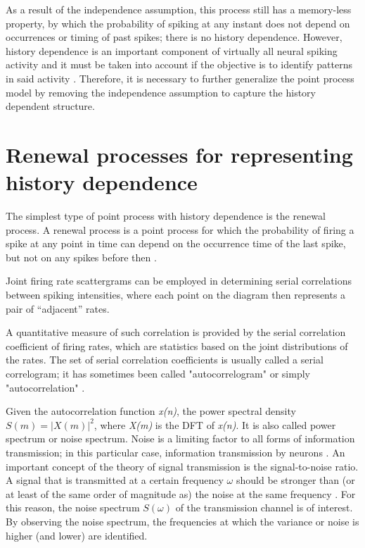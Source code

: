 \documentclass{kththesis}
\begin{document}
As a result of the independence assumption, this process still has a memory-less property, by which the probability of spiking at any instant does not depend on occurrences or timing of past spikes; there is no history dependence. 
However, history dependence is an important component of virtually all neural spiking activity and it must be taken into account if the objective is to identify patterns in said activity \parencite{Perkel}. 
Therefore, it is necessary to further generalize the point process model by removing the independence assumption to capture the history dependent structure.

\section{Renewal processes for representing history dependence}

The simplest type of point process with history dependence is the renewal process. 
A renewal process is a point process for which the probability of firing a spike at any point in time can depend on the occurrence time of the last spike, but not on any spikes before then  \parencite{Perkel}. 

Joint firing rate scattergrams can be employed in determining serial correlations between spiking intensities, where each point on the diagram then represents a pair of “adjacent” rates. 

A quantitative measure of such correlation is provided by the serial correlation coefficient of firing rates, which are statistics based on the joint distributions of the rates. 
The set of serial correlation coefficients is usually called a serial correlogram; it has sometimes been called "autocorrelogram" or simply "autocorrelation"  \parencite{Perkel}. 

Given the autocorrelation function \textit{x(n)}, the power spectral density \begin{math}S(m) = |X(m)|^2\end{math}, where \textit{X(m)} is the DFT of \textit{x(n)}. 
It is also called power spectrum or noise spectrum. 
Noise is a limiting factor to all forms of information transmission; in this particular case, information transmission by neurons \parencite{Gerstner}. 
An important concept of the theory of signal transmission is the signal-to-noise ratio. 
A signal that is transmitted at a certain frequency \begin{math}\omega\end{math} should be stronger than (or at least of the same order of magnitude as) the noise at the same frequency \parencite{Gerstner}. 
For this reason, the noise spectrum \begin{math}S(\omega)\end{math} of the transmission channel is of interest. 
By observing the noise spectrum, the frequencies at which the variance or noise is higher (and lower) are identified.
\end{document}
